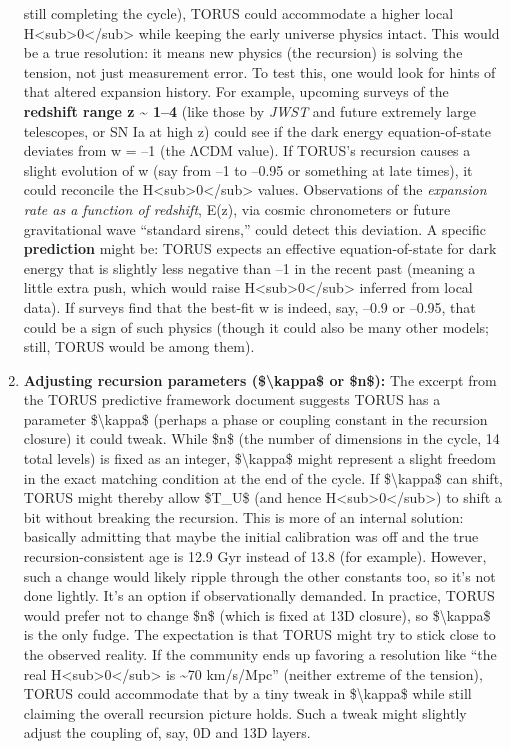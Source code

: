 \begin{enumerate}
  still completing the cycle), TORUS could accommodate a higher local
  H\textless{}sub\textgreater{}0\textless{}/sub\textgreater{} while
  keeping the early universe physics intact​. This would be a true
  resolution: it means new physics (the recursion) is solving the
  tension, not just measurement error. To test this, one would look for
  hints of that altered expansion history. For example, upcoming surveys
  of the \textbf{redshift range z \textasciitilde{} 1--4} (like those by
  \emph{JWST} and future extremely large telescopes, or SN Ia at high z)
  could see if the dark energy equation-of-state deviates from w = --1
  (the ΛCDM value). If TORUS's recursion causes a slight evolution of w
  (say from --1 to --0.95 or something at late times), it could
  reconcile the
  H\textless{}sub\textgreater{}0\textless{}/sub\textgreater{} values.
  Observations of the \emph{expansion rate as a function of redshift},
  E(z), via cosmic chronometers or future gravitational wave ``standard
  sirens,'' could detect this deviation. A specific \textbf{prediction}
  might be: TORUS expects an effective equation-of-state for dark energy
  that is slightly less negative than --1 in the recent past (meaning a
  little extra push, which would raise
  H\textless{}sub\textgreater{}0\textless{}/sub\textgreater{} inferred
  from local data)​. If surveys find that the best-fit w is indeed, say,
  --0.9 or --0.95, that could be a sign of such physics (though it could
  also be many other models; still, TORUS would be among them).
\item
  \textbf{Adjusting recursion parameters (\$\textbackslash{}kappa\$ or
  \$n\$):} The excerpt from the TORUS predictive framework document
  suggests TORUS has a parameter \$\textbackslash{}kappa\$ (perhaps a
  phase or coupling constant in the recursion closure) it could tweak​.
  While \$n\$ (the number of dimensions in the cycle, 14 total levels)
  is fixed as an integer, \$\textbackslash{}kappa\$ might represent a
  slight freedom in the exact matching condition at the end of the
  cycle. If \$\textbackslash{}kappa\$ can shift, TORUS might thereby
  allow \$T\_U\$ (and hence
  H\textless{}sub\textgreater{}0\textless{}/sub\textgreater{}) to shift
  a bit without breaking the recursion. This is more of an internal
  solution: basically admitting that maybe the initial calibration was
  off and the true recursion-consistent age is 12.9 Gyr instead of 13.8
  (for example). However, such a change would likely ripple through the
  other constants too, so it's not done lightly. It's an option if
  observationally demanded. In practice, TORUS would prefer not to
  change \$n\$ (which is fixed at 13D closure), so
  \$\textbackslash{}kappa\$ is the only fudge. The expectation is that
  TORUS might try to stick close to the observed reality. If the
  community ends up favoring a resolution like ``the real
  H\textless{}sub\textgreater{}0\textless{}/sub\textgreater{} is
  \textasciitilde{}70 km/s/Mpc'' (neither extreme of the tension), TORUS
  could accommodate that by a tiny tweak in \$\textbackslash{}kappa\$
  while still claiming the overall recursion picture holds​. Such a
  tweak might slightly adjust the coupling of, say, 0D and 13D layers.
\end{enumerate}


